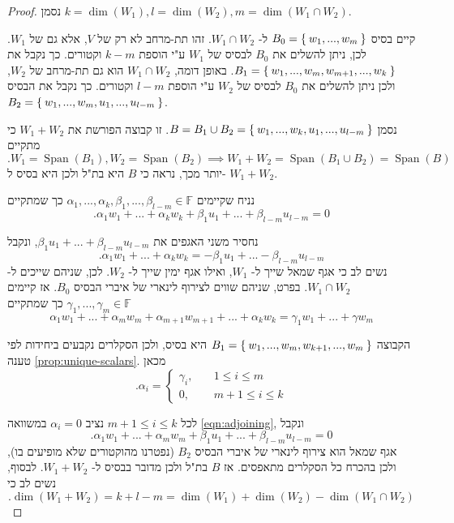\documentclass[12pt]{report}
\theoremstyle{plain}
\theoremstyle{definition}
\newcommand{\F}{\mathbb{F}}
\newcommand{\0}{\mathbf{0}}
\DeclareMathOperator{\Span}{Span}
\begin{document}
\begin{proof}
נסמן
$k=\dim(W_1), l=\dim(W_2), m=\dim(W_1\cap W_2)$.

קיים בסיס
$B_0=\Set{w_1,...,w_m}$
ל-
$W_1\cap W_2$.
זהו תת-מרחב לא רק של
$V$,
אלא גם של 
$W_1$.
לכן, ניתן להשלים את 
$B_0$
לבסיס של 
$W_1$
ע"י הוספת 
$k-m$
וקטורים. כך נקבל את
$B_1=\Set{w_1,...,w_m,w_{m+1},...,w_k}$.
באופן דומה, 
$W_1\cap W_2$
הוא גם תת-מרחב של 
$W_2$,
ולכן ניתן להשלים את 
$B_0$
לבסיס של 
$W_2$
ע"י הוספת 
$l-m$
וקטורים. כך נקבל את הבסיס
$B_2=\Set{w_1,...,w_m,u_1,...,u_{l-m}}$. 

נסמן 
$B=B_1\cup B_2=\Set{w_1,...,w_k,u_1,...,u_{l-m}}$.
זו קבוצה הפורשת את 
$W_1+W_2$
כי מתקיים
$$
.W_1=\Span(B_1),W_2=\Span(B_2) \implies W_1+W_2=\Span(B_1\cup B_2)=\Span(B)
$$
יותר מכך, נראה כי 
$B$
היא בת"ל ולכן היא בסיס ל-
$W_1+W_2$.

נניח שקיימים
$\alpha_1,...,\alpha_k,\beta_1,...,\beta_{l-m}\in\F$
כך שמתקיים
\begin{equation}\label{eqn:adjoining}
.\alpha_1 w_1+...+\alpha_k w_k+\beta_1 u_1+...+\beta_{l-m} u_{l-m}=0
\end{equation}

נחסיר משני האגפים את
$\beta_1 u_1+...+\beta_{l-m} u_{l-m}$,
ונקבל
$$
.\alpha_1 w_1+...+\alpha_k w_k=-\beta_1 u_1+...-\beta_{l-m} u_{l-m}
$$
נשים לב כי אגף שמאל שייך ל-
$W_1$,
ואילו אגף ימין שייך ל-
$W_2$.
לכן, שניהם שייכים ל-
$W_1\cap W_2$.
בפרט, שניהם שווים לצירוף לינארי של איברי הבסיס
$B_0$.
אז קיימים 
$\gamma_1,...,\gamma_m\in\F$
כך שמתקיים
$$
\alpha_1 w_1+...+\alpha_m w_m+\alpha_{m+1} w_{m+1}+...+\alpha_k w_k=\gamma_1w_1+...+\gamma w_m
$$

הקבוצה
$B_1=\Set{w_1,...,w_m,w_{k+1},...,w_m}$
היא בסיס, ולכן הסקלרים נקבעים ביחידות לפי טענה
\ref{prop:unique-scalars}.
מכאן
$$
.\alpha_i=\begin{cases}
\gamma_i,\quad &1\leq i\leq m \\
0, \quad &m+1\leq i\leq k
\end{cases}
$$

לכל
$m+1\leq i\leq k$
נציב 
$\alpha_i=0$
במשוואה
\ref{eqn:adjoining},
ונקבל
$$
.\alpha_1 w_1+...+\alpha_m w_m+\beta_1 u_1+...+\beta_{l-m} u_{l-m}=0
$$
אגף שמאל הוא צירוף לינארי של איברי הבסיס
$B_2$
(נפטרנו מהוקטורים שלא מופיעים בו),
ולכן בהכרח כל הסקלרים מתאפסים. אז
$B$
בת"ל ולכן מדובר בבסיס
ל-
$W_1+W_2$. 
לבסוף, נשים לב כי
$$
.\dim(W_1+W_2)=k+l-m=\dim(W_1)+\dim(W_2)-\dim(W_1\cap W_2)
$$


\end{proof}
\end{document}

